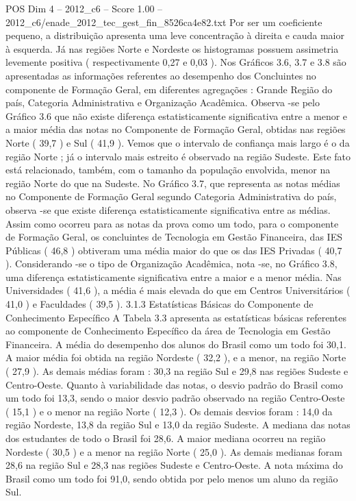 \begin{textsample}{POS Dim 4 – 2012\_c6 – Score 1.00 – 2012\_c6/enade\_2012\_tec\_gest\_fin\_8526ca4e82.txt}
Por ser um coeficiente pequeno, a distribuição apresenta uma leve concentração à direita e cauda maior à esquerda.
Já nas regiões Norte e Nordeste os histogramas possuem assimetria levemente positiva ( respectivamente 0,27 e 0,03 ).
Nos Gráficos 3.6, 3.7 e 3.8 são apresentadas as informações referentes ao desempenho dos Concluintes no componente de Formação Geral, em diferentes agregações : Grande Região do país, Categoria Administrativa e Organização Acadêmica.
Observa -se pelo Gráfico 3.6 que não existe diferença estatisticamente significativa entre a menor e a maior média das notas no Componente de Formação Geral, obtidas nas regiões Norte ( 39,7 ) e Sul ( 41,9 ).
Vemos que o intervalo de confiança mais largo é o da região Norte ; já o intervalo mais estreito é observado na região Sudeste.
Este fato está relacionado, também, com o tamanho da população envolvida, menor na região Norte do que na Sudeste.
No Gráfico 3.7, que representa as notas médias no Componente de Formação Geral segundo Categoria Administrativa do país, observa -se que existe diferença estatisticamente significativa entre as médias.
Assim como ocorreu para as notas da prova como um todo, para o componente de Formação Geral, os concluintes de Tecnologia em Gestão Financeira, das IES Públicas ( 46,8 ) obtiveram uma média maior do que os das IES Privadas ( 40,7 ).
Considerando -se o tipo de Organização Acadêmica, nota -se, no Gráfico 3.8, uma diferença estatisticamente significativa entre a maior e a menor média.
Nas Universidades ( 41,6 ), a média é mais elevada do que em Centros Universitários ( 41,0 ) e Faculdades ( 39,5 ). 3.1.3 Estatísticas Básicas do Componente de Conhecimento Específico A Tabela 3.3 apresenta as estatísticas básicas referentes ao componente de Conhecimento Específico da área de Tecnologia em Gestão Financeira.
A média do desempenho dos alunos do Brasil como um todo foi 30,1.
A maior média foi obtida na região Nordeste ( 32,2 ), e a menor, na região Norte ( 27,9 ).
As demais médias foram : 30,3 na região Sul e 29,8 nas regiões Sudeste e Centro-Oeste.
Quanto à variabilidade das notas, o desvio padrão do Brasil como um todo foi 13,3, sendo o maior desvio padrão observado na região Centro-Oeste ( 15,1 ) e o menor na região Norte ( 12,3 ).
Os demais desvios foram : 14,0 da região Nordeste, 13,8 da região Sul e 13,0 da região Sudeste.
A mediana das notas dos estudantes de todo o Brasil foi 28,6.
A maior mediana ocorreu na região Nordeste ( 30,5 ) e a menor na região Norte ( 25,0 ).
As demais medianas foram 28,6 na região Sul e 28,3 nas regiões Sudeste e Centro-Oeste.
A nota máxima do Brasil como um todo foi 91,0, sendo obtida por pelo menos um aluno da região Sul.

\end{textsample}
